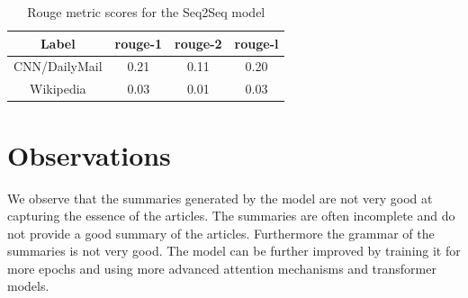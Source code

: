 \documentclass{article}
\begin{document}
\begin{table}[h]
    \label{table:nb_results_1}
\centering
\begin{tabular}{|c|c|c|c|}
\hline
\textbf{Label} & \textbf{rouge-1} & \textbf{rouge-2} & \textbf{rouge-l} \\ \hline
CNN/DailyMail        & 0.21               & 0.11            & 0.20                          \\ \hline
Wikipedia            & 0.03               & 0.01            & 0.03                          \\ \hline
\end{tabular}
\bigskip
\caption{Rouge metric scores for the Seq2Seq model}
\end{table}

\section{Observations}
We observe that the summaries generated by the model are not very good at capturing the essence of the articles. The summaries are often incomplete and do not provide a good summary of the articles. Furthermore the grammar of the summaries is not very good. The model can be further improved by training it for more epochs and using more advanced attention mechanisms and transformer models.
\end{document}
